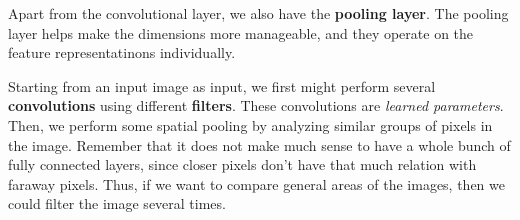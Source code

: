 \documentclass{tufte-handout}
\begin{document}
Apart from the convolutional layer, we also have the \textbf{pooling layer}.
The pooling layer helps make the dimensions more manageable, and they operate on the feature representatinons
	individually.

Starting from an input image as input, we first might perform several \textbf{convolutions} using different
\textbf{filters}. 
These convolutions are \textit{learned parameters}. 
Then, we perform some spatial pooling by analyzing similar groups of pixels in the image.
Remember that it does not make much sense to have a whole bunch of fully connected layers, since closer 
	pixels don't have that  much relation with faraway pixels.
Thus, if we want to compare general areas of the images, then we could filter the image several times.
\end{document}

